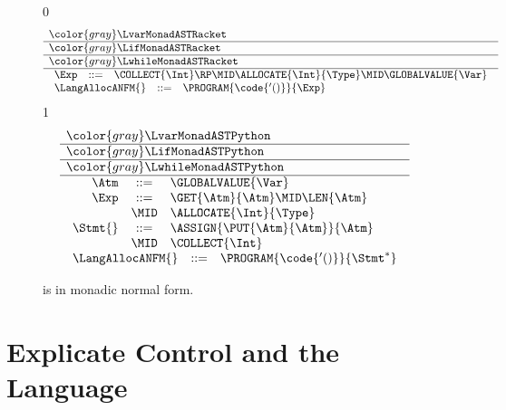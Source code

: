 \documentclass[7x10]{TimesAPriori_MIT}%
\newcommand{\gray}[1]{{\color{gray} #1}}
\def\racketEd{0}
\def\pythonEd{1}
\def\edition{1}
\newcommand{\pythonColor}[0]{}
\numberwithin{theorem}{chapter}
\numberwithin{definition}{chapter}
\numberwithin{equation}{chapter}
\begin{document}
\newcommand{\LtupMonadASTRacket}{
\begin{array}{rcl}
\Exp &::=& \COLLECT{\Int} \RP \MID \ALLOCATE{\Int}{\Type}
   \MID \GLOBALVALUE{\Var}
\end{array}

}

\newcommand{\LtupMonadASTPython}{
\begin{array}{rcl}
\Atm &::=& \GLOBALVALUE{\Var} \\
\Exp &::=& \GET{\Atm}{\Atm} 
     \MID \LEN{\Atm}\\
   &\MID& \ALLOCATE{\Int}{\Type}\\
\Stmt{} &::=& \ASSIGN{\PUT{\Atm}{\Atm}}{\Atm} \\
   &\MID& \COLLECT{\Int}
\end{array}
}

\begin{figure}[tp]
\centering
\begin{tcolorbox}[colback=white]
\small
{\if\edition\racketEd    
\[
\begin{array}{l}
  \gray{\LvarMonadASTRacket} \\ \hline
  \gray{\LifMonadASTRacket} \\ \hline
  \gray{\LwhileMonadASTRacket} \\ \hline
    \LtupMonadASTRacket \\
\begin{array}{rcl}
\LangAllocANFM{}  &::=& \PROGRAM{\code{'()}}{\Exp} 
\end{array}
\end{array}
\]
\fi}
{\if\edition\pythonEd\pythonColor
\[
\begin{array}{l}
  \gray{\LvarMonadASTPython} \\ \hline
  \gray{\LifMonadASTPython} \\ \hline
  \gray{\LwhileMonadASTPython} \\ \hline
  \LtupMonadASTPython   \\
  \begin{array}{rcl}
     \LangAllocANFM{} &::=& \PROGRAM{\code{'()}}{\Stmt^{*}}
  \end{array}
\end{array}
\]
\fi}
\end{tcolorbox}

\caption{\LangAllocANF{} is \LangAlloc{} in monadic normal form.}
\label{fig:Lvec-anf-syntax}
\end{figure}


\section{Explicate Control and the \LangCVec{} Language}
\label{sec:explicate-control-r3}
\end{document}
